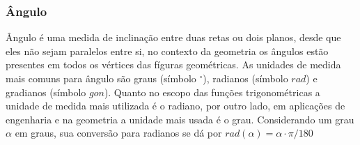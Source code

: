 \begin{multicols*}{2}
    \begin{table}[H]
    \end{table}

    \subsubsection*{Ângulo}

    Ângulo é uma medida de inclinação entre duas retas ou dois planos, desde que eles não sejam paralelos entre si, no 
    contexto da geometria os ângulos estão presentes em todos os vértices das fíguras geométricas. 
    As unidades de medida mais comuns para ângulo são graus (símbolo $^{\circ}$), radianos (símbolo $rad$) e gradianos (símbolo $gon$).
    Quanto no escopo das funções trigonométricas a unidade de medida mais utilizada é o radiano, por outro lado, 
    em aplicações de engenharia e na geometria a unidade mais usada é o grau. Considerando um grau $\alpha$ em graus, 
    sua conversão para radianos se dá por $rad(\alpha) = \alpha\cdot\pi/180$ 



\end{multicols*}

